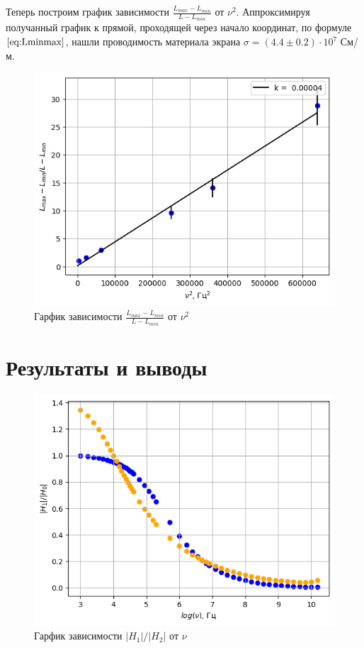 \indent Теперь построим график зависимости $\frac{L_{max} - L_{min}}{L - L_{min}}$ от $\nu^2$. Аппроксимируя получанный график к прямой, проходящей через начало координат, по формуле $\ref{eq:Lminmax}$, нашли проводимость материала экрана $\sigma = (4.4\pm 0.2)\cdot 10^{7}$ См/м.

\begin{figure}[h!]
    \centering
    \includegraphics[width=12cm]{images/plot5.png}
    \caption{Гарфик зависимости $\frac{L_{max} - L_{min}}{L - L_{min}}$ от $\nu^2$}
\end{figure}


\section*{Результаты и выводы}

\begin{figure}[h!]
    \centering
    \includegraphics[width=12cm]{images/plot6.png}
    \caption{Гарфик зависимости $|H_1| / |H_2|$ от $\nu$}
\end{figure}

